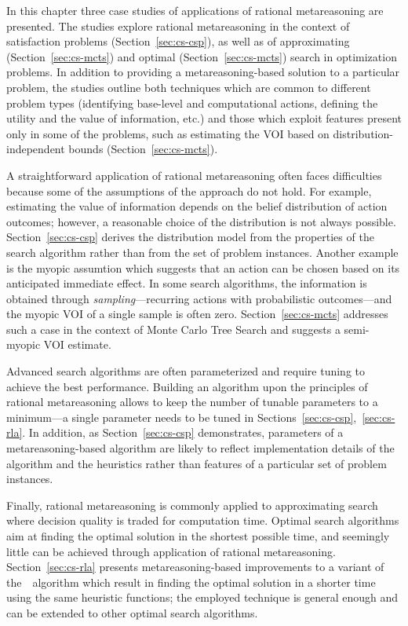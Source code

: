 In this chapter three case studies of applications of rational
metareasoning are presented. The studies explore rational
metareasoning in the context of satisfaction problems
(Section~\ref{sec:cs-csp}), as well as of approximating
(Section~\ref{sec:cs-mcts}) and optimal (Section~\ref{sec:cs-mcts})
search in optimization problems. In addition to providing a
metareasoning-based solution to a particular problem, the studies
outline both techniques which are common to different problem types
(identifying base-level and computational actions, 
defining the utility and the value of information, etc.)
and those which exploit features present only in some of the problems,
such as estimating the VOI based on distribution-independent bounds
(Section~\ref{sec:cs-mcts}). 

A straightforward application of rational metareasoning often faces
difficulties because some of the assumptions of the approach do not
hold. For example, estimating the value of information depends on
the belief distribution of action outcomes; however, a reasonable choice
of the distribution is not always possible. Section~\ref{sec:cs-csp}
derives the distribution model from the properties of the search
algorithm rather than from the set of problem instances. Another
example is the myopic assumtion \cite{Russell.right} which suggests
that an action can be chosen based on its anticipated immediate
effect. In some search algorithms, the information is obtained through
\emph{sampling}---recurring actions with probabilistic outcomes---and
the myopic VOI of a single sample is often
zero. Section~\ref{sec:cs-mcts} addresses such a case in the context
of Monte Carlo Tree Search and suggests a semi-myopic VOI estimate.

Advanced search algorithms are often parameterized and require tuning
to achieve the best performance. Building an algorithm upon the
principles of rational metareasoning allows to keep the number of
tunable parameters to a minimum---a single parameter needs to be tuned
in Sections~\ref{sec:cs-csp},~\ref{sec:cs-rla}. In addition, as
Section~\ref{sec:cs-csp} demonstrates, parameters
of a metareasoning-based algorithm are likely to reflect
implementation details of the algorithm and the heuristics rather
than features of a particular set of problem instances.

Finally, rational metareasoning is commonly applied to approximating
search where decision quality is traded for computation time. Optimal
search algorithms aim at finding the optimal solution in the shortest
possible time, and seemingly little can be achieved through
application of rational metareasoning.  Section~\ref{sec:cs-rla}
presents metareasoning-based improvements to a variant of
the~\astar~algorithm which result in finding the optimal solution in a
shorter time using the same heuristic functions; the employed
technique is general enough and can be extended to other optimal
search algorithms.


